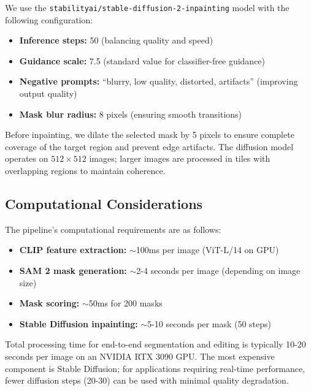 We use the \texttt{stabilityai/stable-diffusion-2-inpainting} model with the following configuration:

\begin{itemize}
    \item \textbf{Inference steps:} 50 (balancing quality and speed)
    \item \textbf{Guidance scale:} 7.5 (standard value for classifier-free guidance)
    \item \textbf{Negative prompts:} ``blurry, low quality, distorted, artifacts'' (improving output quality)
    \item \textbf{Mask blur radius:} 8 pixels (ensuring smooth transitions)
\end{itemize}

Before inpainting, we dilate the selected mask by 5 pixels to ensure complete coverage of the target region and prevent edge artifacts. The diffusion model operates on $512 \times 512$ images; larger images are processed in tiles with overlapping regions to maintain coherence.

\subsection{Computational Considerations}

The pipeline's computational requirements are as follows:
\begin{itemize}
    \item \textbf{CLIP feature extraction:} $\sim$100ms per image (ViT-L/14 on GPU)
    \item \textbf{SAM 2 mask generation:} $\sim$2-4 seconds per image (depending on image size)
    \item \textbf{Mask scoring:} $\sim$50ms for 200 masks
    \item \textbf{Stable Diffusion inpainting:} $\sim$5-10 seconds per mask (50 steps)
\end{itemize}

Total processing time for end-to-end segmentation and editing is typically 10-20 seconds per image on an NVIDIA RTX 3090 GPU. The most expensive component is Stable Diffusion; for applications requiring real-time performance, fewer diffusion steps (20-30) can be used with minimal quality degradation.

